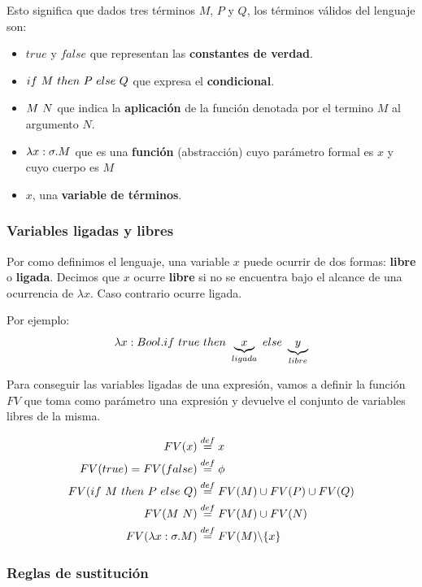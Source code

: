Esto significa que dados tres términos $M$, $P$ y $Q$, los términos válidos del lenguaje son:
\begin{itemize}
    \item $true$ y $false$ que representan las \textbf{constantes de verdad}.
    \item $ if~ M~ then~ P~ else~ Q$ que expresa el \textbf{condicional}.
    \item $M~N$ que indica la \textbf{aplicación} de la función denotada por el termino $M$ al argumento $N$.
    \item $\lambda x: \sigma . M$ que es una \textbf{función} (abstracción) cuyo parámetro formal es $x$ y cuyo cuerpo es $M$
    \item $x$, una \textbf{variable de términos}.
\end{itemize}

\subsubsection{Variables ligadas y libres}
Por como definimos el lenguaje, una variable $x$ puede ocurrir de dos formas: \textbf{libre} o \textbf{ligada}. Decimos que $x$ ocurre \textbf{libre} si no se encuentra bajo el alcance de una ocurrencia de $\lambda x$. Caso contrario ocurre ligada.

Por ejemplo:
$$\lambda x: Bool . if~ true~ then~ \underbrace{x}_{ligada}~ else~ \underbrace{y}_{libre} $$

Para conseguir las variables ligadas de una expresión, vamos a definir la función $FV$ que toma como parámetro una expresión y devuelve el conjunto de variables libres de la misma.

\begin{equation*}
\begin{split}
FV(x) &\overset{def}{=} {x} \\
FV(true) = FV(false) &\overset{def}{=} \phi \\
FV(if~ M~ then~ P~ else~ Q) &\overset{def}{=} FV(M)\cup FV(P)\cup FV(Q) \\
FV(M~N) &\overset{def}{=} FV(M)\cup FV(N) \\
FV(\lambda x: \sigma . M) &\overset{def}{=} FV(M) \backslash \{x\}
\end{split}
\end{equation*}

\subsubsection{Reglas de sustitución}

